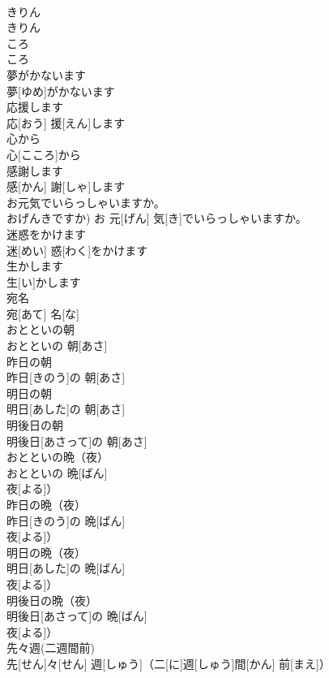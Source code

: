 \documentclass[8pt]{extreport}
\begin{document}
\begin{CJK}{UTF8}{min}
\\	きりん	
\\	きりん		
\\	ころ	
\\	ころ		
\\	夢がかないます	
\\	夢[ゆめ]がかないます		
\\	応援します	
\\	応[おう] 援[えん]します		
\\	心から	
\\	心[こころ]から		
\\	感謝します	
\\	感[かん] 謝[しゃ]します		
\\	お元気でいらっしゃいますか。	
\\	おげんきですか)	お 元[げん] 気[き]でいらっしゃいますか。		
\\	迷惑をかけます	
\\	迷[めい] 惑[わく]をかけます		
\\	生かします	
\\	生[い]かします		
\\	宛名	
\\	宛[あて] 名[な]		
\\	おとといの朝	
\\	おとといの 朝[あさ]		
\\	昨日の朝	
\\	昨日[きのう]の 朝[あさ]		
\\	明日の朝	
\\	明日[あした]の 朝[あさ]		
\\	明後日の朝	
\\	明後日[あさって]の 朝[あさ]		
\\	おとといの晩（夜）	
\\	おとといの 晩[ばん]
\\	夜[よる]）		
\\	昨日の晩（夜）	
\\	昨日[きのう]の 晩[ばん]
\\	夜[よる]）		
\\	明日の晩（夜）	
\\	明日[あした]の 晩[ばん]
\\	夜[よる]）		
\\	明後日の晩（夜）	
\\	明後日[あさって]の 晩[ばん]
\\	夜[よる]）		
\\	先々週(二週間前)	
\\	先[せん]々[せん] 週[しゅう]（二[に]週[しゅう]間[かん] 前[まえ]）		

\end{CJK}
\end{document}
